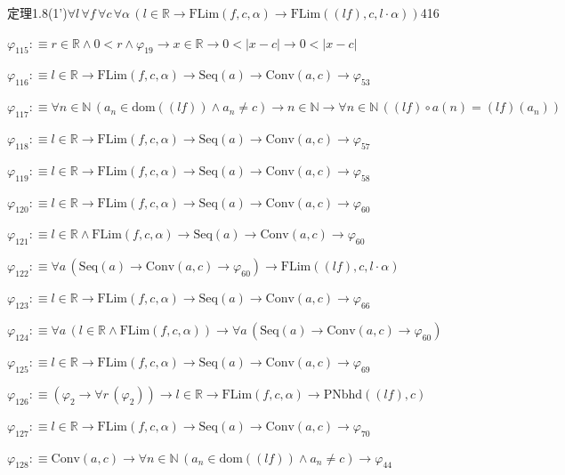 \begin{fullproof}{定理1.8(1')}{$\forall l\,\forall f\,\forall c\,\forall \alpha\,(l \in \mathbb{R} \to \mathrm{FLim}(f,c,\alpha) \to \mathrm{FLim}((l f),c,l \cdot \alpha))$}{416}
\begin{abbrevlist}
\item $\varphi_{115} :\equiv r \in \mathbb{R} \land 0 < r \land \varphi_{19} \to x \in \mathbb{R} \to 0 < \lvert x - c \rvert \to 0 < \lvert x - c \rvert$
\item $\varphi_{116} :\equiv l \in \mathbb{R} \to \mathrm{FLim}(f,c,\alpha) \to \mathrm{Seq}(a) \to \mathrm{Conv}(a,c) \to \varphi_{53}$
\item $\varphi_{117} :\equiv \forall n \in \mathbb{N}\,(a_{n} \in \mathrm{dom}((l f)) \land a_{n} \neq c) \to n \in \mathbb{N} \to \forall n \in \mathbb{N}\,((l f) \circ a(n) = (l f)(a_{n}))$
\item $\varphi_{118} :\equiv l \in \mathbb{R} \to \mathrm{FLim}(f,c,\alpha) \to \mathrm{Seq}(a) \to \mathrm{Conv}(a,c) \to \varphi_{57}$
\item $\varphi_{119} :\equiv l \in \mathbb{R} \to \mathrm{FLim}(f,c,\alpha) \to \mathrm{Seq}(a) \to \mathrm{Conv}(a,c) \to \varphi_{58}$
\item $\varphi_{120} :\equiv l \in \mathbb{R} \to \mathrm{FLim}(f,c,\alpha) \to \mathrm{Seq}(a) \to \mathrm{Conv}(a,c) \to \varphi_{60}$
\item $\varphi_{121} :\equiv l \in \mathbb{R} \land \mathrm{FLim}(f,c,\alpha) \to \mathrm{Seq}(a) \to \mathrm{Conv}(a,c) \to \varphi_{60}$
\item $\varphi_{122} :\equiv \forall a\,(\mathrm{Seq}(a) \to \mathrm{Conv}(a,c) \to \varphi_{60}) \to \mathrm{FLim}((l f),c,l \cdot \alpha)$
\item $\varphi_{123} :\equiv l \in \mathbb{R} \to \mathrm{FLim}(f,c,\alpha) \to \mathrm{Seq}(a) \to \mathrm{Conv}(a,c) \to \varphi_{66}$
\item $\varphi_{124} :\equiv \forall a\,(l \in \mathbb{R} \land \mathrm{FLim}(f,c,\alpha)) \to \forall a\,(\mathrm{Seq}(a) \to \mathrm{Conv}(a,c) \to \varphi_{60})$
\item $\varphi_{125} :\equiv l \in \mathbb{R} \to \mathrm{FLim}(f,c,\alpha) \to \mathrm{Seq}(a) \to \mathrm{Conv}(a,c) \to \varphi_{69}$
\item $\varphi_{126} :\equiv (\varphi_{2} \to \forall r\,(\varphi_{2})) \to l \in \mathbb{R} \to \mathrm{FLim}(f,c,\alpha) \to \mathrm{PNbhd}((l f),c)$
\item $\varphi_{127} :\equiv l \in \mathbb{R} \to \mathrm{FLim}(f,c,\alpha) \to \mathrm{Seq}(a) \to \mathrm{Conv}(a,c) \to \varphi_{70}$
\item $\varphi_{128} :\equiv \mathrm{Conv}(a,c) \to \forall n \in \mathbb{N}\,(a_{n} \in \mathrm{dom}((l f)) \land a_{n} \neq c) \to \varphi_{44}$

\end{abbrevlist}
\end{fullproof}
